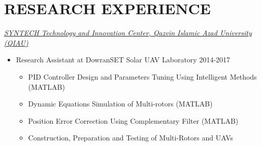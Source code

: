 \documentclass[10pt,a4paper,sans]{moderncv} %
\begin{document}

	\section{RESEARCH EXPERIENCE}
    
		\href{http://www.syntechcenter.ir/}{ \emph{SYNTECH Technology and Innovation Center, Qazvin Islamic Azad University (QIAU)}} 
		
		\vspace{0.5em}
		
		\begin{itemize}[nosep, leftmargin=0.9cm ]
			\item Research Assistant at DowranSET Solar UAV Laboratory \hfill 2014-2017
			\begin{itemize}[nosep]
				\item PID Controller Design and Parameters Tuning Using Intelligent Methods (MATLAB)
				\item Dynamic Equations Simulation of Multi-rotors (MATLAB)
				\item Position Error Correction Using Complementary Filter (MATLAB)
				\item Construction, Preparation and Testing of Multi-Rotors and UAVs
			\end{itemize}
		\end{itemize}
		
		\vspace{0.3em}
		
\end{document}

